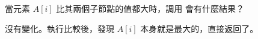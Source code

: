 \startEXERCISE
當元素 $A[i]$ 比其兩個子節點的值都大時，調用  會有什麼結果？
\stopEXERCISE

\startANSWER
沒有變化。執行比較後，發現 $A[i]$ 本身就是最大的，直接返回了。
\stopANSWER
